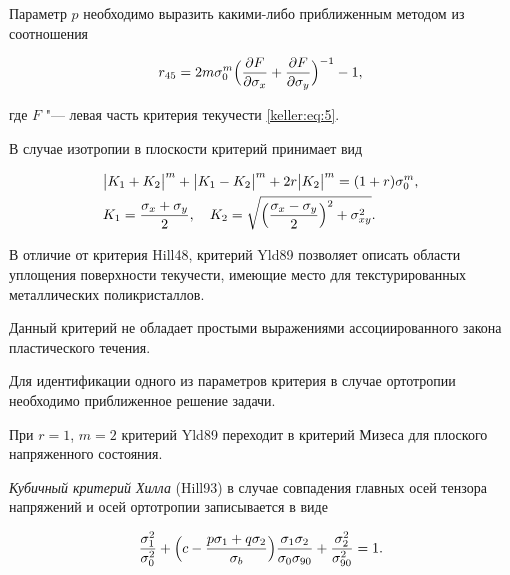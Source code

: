 Параметр $p$ необходимо выразить какими-либо приближенным методом из соотношения 

$$r_{45} = 2m\sigma_0^m \Bigl(\frac{\partial F}{\partial \sigma_x} + \frac{\partial F}{\partial \sigma_y}\Bigr)^{-1} - 1,$$ 

где $F$ "--- левая часть критерия текучести \eqref{keller:eq:5}.



В случае изотропии в плоскости критерий принимает вид

\begin{equation}

\begin{split}

&\bigl| K_1 + K_2 \bigr|^m + \bigl| K_1 - K_2 \bigr|^m + 2r\bigl| K_2 \bigr|^m = (1+r)\sigma_0^m,\\

& K_1 = \frac{\sigma_x + \sigma_y}{2},\quad K_2 = \sqrt{\Bigl( \frac{\sigma_x - \sigma_y}{2} \Bigr)^2 + \sigma_{xy}^2}. 

\end{split}

\end{equation}



В отличие от критерия {\small\sc Hill48}, критерий {\small\sc Yld89} позволяет описать области уплощения поверхности текучести, имеющие место для текстурированных металлических поликристаллов. 

Данный критерий не обладает простыми выражениями ассоциированного закона пластического течения. 

Для идентификации одного из параметров критерия в случае ортотропии необходимо приближенное решение задачи. 

При $r=1$, $m=2$ критерий {\small\sc Yld89} переходит в критерий Мизеса для плоского напряженного состояния.



\smallskip



{\it Кубичный критерий Хилла} ({\small\sc Hill93}) \cite{keller:bib:hill1993} в случае совпадения главных осей тензора напряжений и осей ортотропии записывается в виде

\begin{equation}\label{keller:eq:6}

\frac{\sigma_1^2}{\sigma_0^2} + \Bigl( c -\frac{p\sigma_1 + q\sigma_2}{\sigma_b} \Bigr)\frac{\sigma_1 \sigma_2}{\sigma_0 \sigma_{90}} +\frac{\sigma_2^2}{\sigma_{90}^2} = 1.

\end{equation} 

